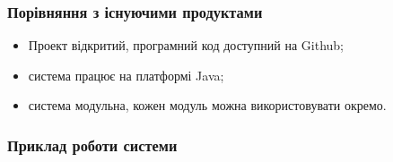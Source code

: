 \documentclass{beamer}
\begin{document}
\begin{frame}
    \frametitle{Порівняння з існуючими продуктами}
    \begin{itemize}
        \item Проект відкритий, програмний код доступний на Github;
        \item система працює на платформі Java;
        \item система модульна, кожен модуль можна використовувати окремо.
    \end{itemize}
    \begin{figure}
    \end{figure}
\end{frame}

\begin{frame}
    \frametitle{Приклад роботи системи}
    \begin{figure}
    \end{figure}
\end{frame}
\end{document}

